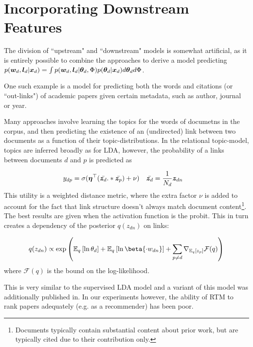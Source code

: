 

\newcommand \ld { \vv{l}_d }
\newcommand \thod {{ \vv{\theta}_{\cdot d} }}
\newcommand \thko {{ \vv{\theta}_{k \cdot} }}

\section{Incorporating Downstream Features}
The division of ``upstream" and ``downstream" models is somewhat artificial, as it is entirely possible to combine the approaches to derive a model predicting $p(\wdoc, \ld | \xd) = \int p(\wdoc, \ld|\thd,\Phi) p(\thd | \xd) d\thd d\Phi$.

One such example is a model for predicting both the words and citations (or ``out-links") of academic papers given certain metadata, such as author, journal or year.

Many approaches involve learning the topics for the words of documetns in the corpus, and then predicting the existence of an (undirected) link between two documents as a function of their topic-distributions. In the relational topic-model\cite{Chang2009a}\cite{Chang2010a}, topics are inferred broadly as for LDA, however, the probability of a links between documents $d$ and $p$ is predicted as

\begin{align*}
y_{dp} & = \sigma(\bm \eta^\top (\bar{\bm z_d} .* \bar{\bm z_p}) + \nu) &
\bar{\bm z_d} & = \frac{1}{N_d} \bm z_{dn}
\end{align*}
This utility is a weighted distance metric, where the extra factor $\nu$ is added to account for the fact that link structure doesn't always match document content\footnote{Documents typically contain substantial content about prior work, but are typically cited due to their contribution only.}. The best results are given when the activation function is the probit. This in turn creates a dependency of the posterior $q(z_{dn})$ on links:

\begin{align*}
q(z_{dn}) \propto \exp\left(
\mathbb{E}_q\left[ \ln \theta_d \right]
+ \mathbb{E}_q\left[ \ln \beta{\cdot w_{dn}} \right]
+ \sum_{p \neq d} \nabla_{\ex{z_p}{q}} \mathcal{F}(q)
\right)
\end{align*}
where $\mathcal{F}(q)$ is the bound on the log-likelihood.

This is very similar to the supervised LDA model \cite{Blei2008} and a variant of this model was additionally published in\cite{Neiswanger2014}. In our experiments however, the ability of RTM to rank papers adequately (e.g. as a recommender) has been poor.

